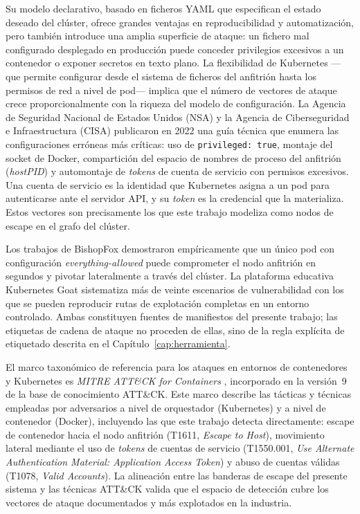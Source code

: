 Su modelo declarativo, basado en ficheros \acs{YAML} que especifican el estado deseado del
clúster, ofrece grandes ventajas en reproducibilidad y automatización, pero también
introduce una amplia superficie de ataque: un fichero mal configurado desplegado en
producción puede conceder privilegios excesivos a un contenedor o exponer secretos
en texto plano. La flexibilidad de Kubernetes —que permite configurar desde
el sistema de ficheros del anfitrión hasta los permisos de red a nivel de pod— implica
que el número de vectores de ataque crece proporcionalmente con la riqueza del modelo
de configuración. La Agencia de Seguridad Nacional de Estados Unidos (\acs{NSA}) y la Agencia de
Ciberseguridad e Infraestructura (\acs{CISA}) publicaron en 2022 una guía técnica
\citep{NSA2022} que enumera las configuraciones erróneas más críticas: uso de
\texttt{privileged: true}, montaje del socket de Docker, compartición del espacio de
nombres de proceso del anfitrión (\textit{hostPID}) y automontaje de \textit{tokens} de cuenta
de servicio con permisos excesivos. Una cuenta de servicio es la identidad que
Kubernetes asigna a un pod para autenticarse ante el servidor \acs{API}, y su
\textit{token} es la credencial que la materializa. Estos vectores son precisamente los que
este trabajo modeliza como nodos de escape en el grafo del clúster.

Los trabajos de BishopFox \citep{BishopFox2021} demostraron empíricamente que un
único pod con configuración \textit{everything-allowed} puede comprometer el nodo
anfitrión en segundos y pivotar lateralmente a través del clúster. La plataforma
educativa Kubernetes Goat \citep{KubernetesGoat} sistematiza más de
veinte escenarios de vulnerabilidad con los que se pueden reproducir rutas de
explotación completas en un entorno controlado. Ambas constituyen fuentes de
manifiestos del presente trabajo; las etiquetas de cadena de ataque no proceden
de ellas, sino de la regla explícita de etiquetado descrita en el
Capítulo~\ref{cap:herramienta}.

El marco taxonómico de referencia para los ataques en entornos de contenedores y
Kubernetes es \textit{MITRE ATT\&CK for Containers}
\citep{MITRE2021Containers}, incorporado en la versión~9 de la base de conocimiento
ATT\&CK. Este marco describe las tácticas y técnicas empleadas por adversarios
a nivel de orquestador (Kubernetes) y a nivel de contenedor (Docker),
incluyendo las que este trabajo detecta directamente: escape de contenedor hacia el
nodo anfitrión (T1611, \textit{Escape to Host}), movimiento lateral mediante el uso
de \textit{tokens} de cuentas de servicio (T1550.001, \textit{Use Alternate
Authentication Material: Application Access Token}) y abuso de cuentas válidas
(T1078, \textit{Valid Accounts}). La alineación
entre las banderas de escape del presente sistema y las técnicas ATT\&CK valida que
el espacio de detección cubre los vectores de ataque documentados y más explotados en
la industria.

